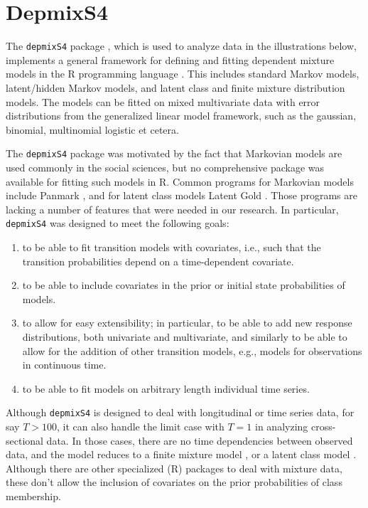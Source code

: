 \documentclass[a4paper,12pt,man]{apa} %
\newcommand{\citep}{\cite}
\newcommand{\pkg}{\texttt}
\begin{document}
\section{DepmixS4}

The \pkg{depmixS4} package \citep{Visser2008a}, which is used to
analyze data in the illustrations below, implements a general
framework for defining and fitting dependent mixture models in the R
programming language \citep{R2008}.  This includes standard Markov
models, latent/hidden Markov models, and latent class and finite
mixture distribution models.  The models can be fitted on mixed
multivariate data with error distributions from the generalized linear
model framework, such as the gaussian, binomial, multinomial logistic
et cetera.

The \pkg{depmixS4} package was motivated by the fact that Markovian
models are used commonly in the social sciences, but no comprehensive
package was available for fitting such models in R. Common programs
for Markovian models include Panmark \citep{Pol1996}, and for latent
class models Latent Gold \citep{Vermunt2003}.  Those programs are
lacking a number of features that were needed in our research.  In
particular, \pkg{depmixS4} was designed to meet the following goals:
\begin{enumerate}

	\item to be able to fit transition models with covariates, i.e.,
	such that the transition probabilities depend on a time-dependent 
	covariate.

	\item to be able to include covariates in the prior or initial
	state probabilities of models.

	\item to allow for easy extensibility; in particular, to be able
	to add new response distributions, both univariate and
	multivariate, and similarly to be able to allow for the addition
	of other transition models, e.g., models for observations in 
	continuous time. 
	
	\item to be able to fit models on arbitrary length individual time 
	series. 

\end{enumerate}

Although \pkg{depmixS4} is designed to deal with longitudinal or time
series data, for say $T>100$, it can also handle the limit case with
$T=1$ in analyzing cross-sectional data.  In those cases, there are no
time dependencies between observed data, and the model reduces to a
finite mixture model \cite{McLachlan2000}, or a latent class model
\cite{McCutcheon1987}.  Although there are other specialized (R)
packages to deal with mixture data, these don't allow the inclusion of 
covariates on the prior probabilities of class membership.
\end{document}
